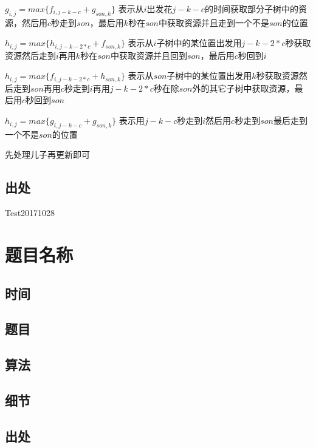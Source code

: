 \documentclass[a4paper]{article}
\begin{document}
		$g_{i,j} = max\{ f_{i,j - k - c} + g_{son,k} \}$
		表示从$i$出发花$j - k - c$的时间获取部分子树中的资源，然后用$c$秒走到$son$，最后用$k$秒在$son$中获取资源并且走到一个不是$son$的位置
		
		$h_{i,j} = max\{ h_{i, j - k - 2 * c} + f_{son,k} \}$
		表示从$i$子树中的某位置出发用$j - k - 2 * c$秒获取资源然后走到$i$再用$k$秒在$son$中获取资源并且回到$son$，最后用$c$秒回到$i$
		
		$h_{i,j} = max\{ f_{i, j - k - 2 * c} + h_{son,k} \}$
		表示从$son$子树中的某位置出发用$k$秒获取资源然后走到$son$再用$c$秒走到$i$再用$j - k - 2 * c$秒在除$son$外的其它子树中获取资源，最后用$c$秒回到$son$
		
		$h_{i,j} = max\{ g_{i,j - k - c} + g_{son, k} \}$
		表示用$j - k - c$秒走到$i$然后用$c$秒走到$son$最后走到一个不是$son$的位置
		
		先处理儿子再更新即可
		
	\subsection{出处}
		
		Test20171028
	
	\newpage
	
	\section{题目名称}
		
	\subsection{时间}
		
	\subsection{题目}
		
	\subsection{算法}
		
	\subsection{细节}
		
	\subsection{出处}
		
\end{document}
